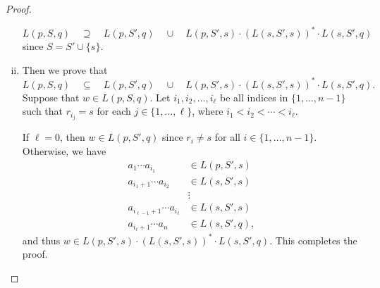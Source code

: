 \begin{proof}
\begin{enumerate}[(i)]
      \begin{equation*}
        L(p, S, q)
          \quad \supseteq \quad L(p, S', q)
          \quad \cup \quad
          L(p, S', s) \cdot (L(s, S', s))^* \cdot L(s, S', q)
      \end{equation*}
      since $S = S' \cup \{s\}$.
    \item Then we prove that
      \begin{equation*}
        L(p, S, q)
          \quad \subseteq \quad L(p, S', q)
          \quad \cup \quad
          L(p, S', s) \cdot (L(s, S', s))^* \cdot L(s, S', q).
      \end{equation*}
      Suppose that $w \in L(p, S, q)$.
      Let $i_1, i_2, \dots, i_\ell$ be all indices in $\{1, \dots, n - 1\}$
      such that $r_{i_j} = s$ for each $j \in \{1, \dots, \ell\}$,
      where $i_1 < i_2 < \cdots < i_\ell$.

      If $\ell = 0$, then $w \in L(p, S', q)$ since $r_i \neq s$ for all
      $i \in \{1, \dots, n - 1\}$.
      Otherwise, we have
      \begin{align*}
        a_1 \cdots a_{i_1} &\in L(p, S', s) \\
        a_{i_1+1} \cdots a_{i_2} &\in L(s, S', s) \\
        &\vdots \\
        a_{i_{\ell-1}+1} \cdots a_{i_\ell} &\in L(s, S', s) \\
        a_{i_\ell+1} \cdots a_n &\in L(s, S', q),
      \end{align*}
      and thus $w \in L(p, S', s) \cdot (L(s, S', s))^* \cdot L(s, S', q)$.
      This completes the proof. \qedhere
  \end{enumerate}
\end{proof}
